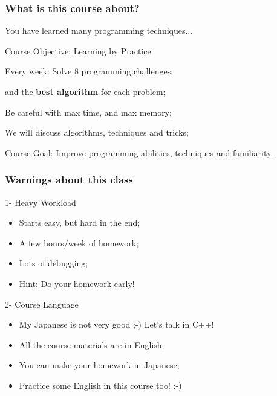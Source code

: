 \documentclass{beamer}
\begin{document}
\begin{frame}
  \frametitle{What is this course about?}

  You have learned many programming techniques...\\\hfill {}

  \begin{block}{Course Objective: Learning by Practice}
    \begin{itemize}
      {\small
    \item Every week: Solve 8 programming challenges;
    \item {} and  the {\bf best algorithm} for each problem;
    \item Be careful with \alert{max time}, and \alert{max memory};
    \item We will discuss algorithms, techniques and tricks;
      }
    \end{itemize}
  \end{block}

  \begin{exampleblock}{Course Goal:}
    Improve programming abilities, techniques and familiarity.
  \end{exampleblock}
\end{frame}

\begin{frame}
  \frametitle{Warnings about this class}
  \begin{alertblock}{1- Heavy Workload}
    \begin{itemize}
    \item Starts easy, but hard in the end;
    \item A few hours/week of homework;
    \item Lots of debugging;

      \bigskip

    \item Hint: Do your homework early!
    \end{itemize}
  \end{alertblock}

  \begin{alertblock}{2- Course Language}
    \begin{itemize}
    \item My Japanese is not very good ;-) Let's talk in C++!
    \item All the course materials are in English;
    \item You can make your homework in Japanese;

      \bigskip

    \item Practice some English in this course too! :-)
    \end{itemize}
  \end{alertblock}

\end{frame}
\end{document}

